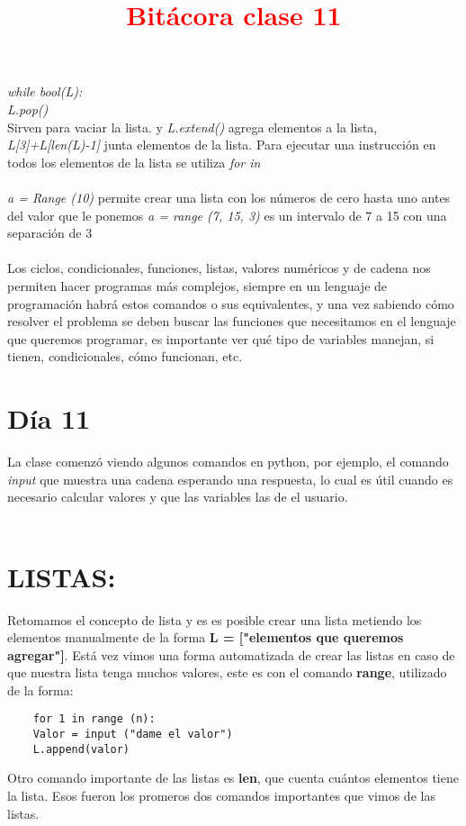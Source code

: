 \documentclass{book}
\begin{document}
	\textit{while bool(L):\\
		L.pop()}\\
	Sirven para vaciar la lista. y \textit{L.extend()}  agrega elementos a la lista, \textit{L[3]+L[len(L)-1]} junta elementos de la lista. Para ejecutar una instrucción en todos los elementos de la lista se utiliza \textit{for in} \\
	\\
	\textit{a = Range (10)} permite crear una lista con los números de cero hasta uno antes del valor que le ponemos
	\textit{a = range (7, 15, 3)} es un intervalo de 7 a 15 con una separación de 3\\
	\\
	Los ciclos, condicionales, funciones, listas, valores numéricos y de cadena nos permiten hacer programas más complejos, siempre en un lenguaje de programación habrá estos comandos o sus equivalentes, y una vez sabiendo cómo resolver el problema se deben buscar las funciones que necesitamos en el lenguaje que queremos programar, es importante ver qué tipo de variables manejan, si tienen, condicionales, cómo funcionan, etc.\\
	
	
	
	
	
	
	\section{Día 11}
	\begin{center}
		\title {\textcolor{red}{\Huge \textbf{Bitácora clase 11}} } 
	\end{center}
	
	La clase comenzó viendo algunos comandos en python, por ejemplo, el comando \textit{input}  que muestra una cadena esperando una respuesta, lo cual es útil cuando es necesario calcular valores y que las variables las de el usuario. \\
	\\
	\section{LISTAS:}
	Retomamos el concepto de lista y es es posible crear una lista metiendo los elementos manualmente de la forma \textbf{L = ["elementos que queremos agregar"]}. Está vez vimos una forma automatizada de crear las listas en caso de que nuestra lista tenga muchos valores, este es con el comando \textbf{range}, utilizado de la forma: \\
	\begin{verbatim}
	for 1 in range (n):
	Valor = input ("dame el valor")
	L.append(valor)
	\end{verbatim}
	Otro comando importante de las listas es \textbf{len}, que cuenta cuántos elementos tiene la lista. Esos fueron los promeros dos comandos importantes que vimos de las listas.
\end{document}
